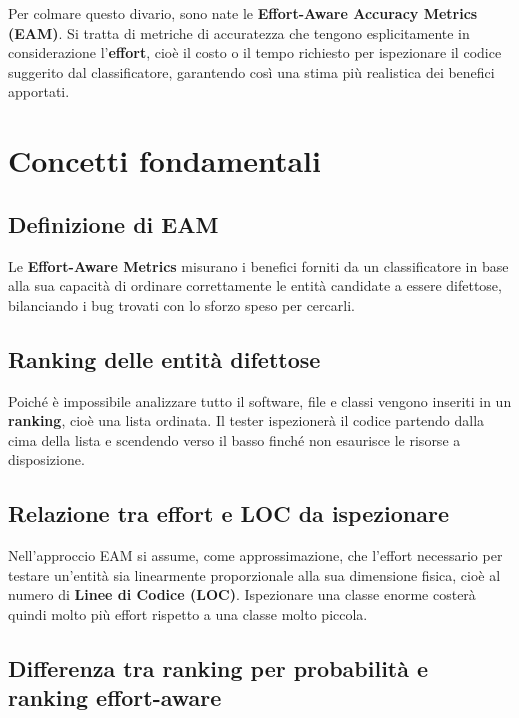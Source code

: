 Per colmare questo divario, sono nate le \textbf{Effort-Aware Accuracy Metrics (EAM)}. Si tratta di metriche di accuratezza che tengono esplicitamente in considerazione l'\textbf{effort}, cioè il costo o il tempo richiesto per ispezionare il codice suggerito dal classificatore, garantendo così una stima più realistica dei benefici apportati.

\section{Concetti fondamentali}

\subsection{Definizione di EAM}

Le \textbf{Effort-Aware Metrics} misurano i benefici forniti da un classificatore in base alla sua capacità di ordinare correttamente le entità candidate a essere difettose, bilanciando i bug trovati con lo sforzo speso per cercarli.

\subsection{Ranking delle entità difettose}

Poiché è impossibile analizzare tutto il software, file e classi vengono inseriti in un \textbf{ranking}, cioè una lista ordinata. Il tester ispezionerà il codice partendo dalla cima della lista e scendendo verso il basso finché non esaurisce le risorse a disposizione.

\subsection{Relazione tra effort e LOC da ispezionare}

\begin{notaprof}
Nell'approccio EAM si assume, come approssimazione, che l'effort necessario per testare un'entità sia linearmente proporzionale alla sua dimensione fisica, cioè al numero di \textbf{Linee di Codice (LOC)}. Ispezionare una classe enorme costerà quindi molto più effort rispetto a una classe molto piccola.
\end{notaprof}

\subsection{Differenza tra ranking per probabilità e ranking effort-aware}

